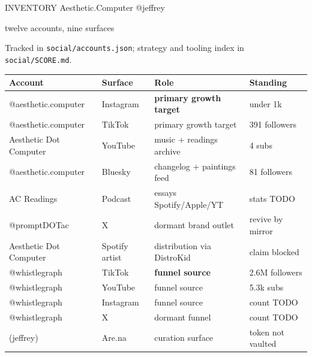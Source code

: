 \documentclass[12pt]{article}
\makeatletter
\newcommand{\ac}{Aesthetic\textcolor{acpink}{.}Computer}
\newenvironment{slide}[2]{%
  \clearpage
  {\footnotesize\color{acgray}\MakeUppercase{#1}\hfill}%
  {\footnotesize\color{acgray}\ac{} \textperiodcentered{} @jeffrey}\par
  \vspace{0.1em}
  {\acbold\fontsize{31pt}{35pt}\selectfont\color{acdark}#2\par}
  \vspace{0.9em}
  \large
}{%
  \vfill
  {\hfill\footnotesize\color{acgray}\thepage}%
}
\makeatother
\begin{document}
\begin{slide}{inventory}{twelve accounts, nine surfaces}
Tracked in \texttt{social/accounts.json}; strategy and tooling index in \texttt{social/SCORE.md}.

\vspace{0.8em}
\begin{center}
\normalsize
\begin{tabular}{@{}llll@{}}
\toprule
\textbf{Account} & \textbf{Surface} & \textbf{Role} & \textbf{Standing} \\
\midrule
@aesthetic.computer & Instagram & \textbf{primary growth target} & under 1k \\
@aesthetic.computer & TikTok & primary growth target & 391 followers \\
Aesthetic Dot Computer & YouTube & music + readings archive & 4 subs \\
@aesthetic.computer & Bluesky & changelog + paintings feed & 81 followers \\
AC Readings & Podcast & essays \textrightarrow{} Spotify/Apple/YT & stats TODO \\
@promptDOTac & X & dormant brand outlet & revive by mirror \\
Aesthetic Dot Computer & Spotify artist & distribution via DistroKid & claim blocked \\
@whistlegraph & TikTok & \textbf{funnel source} & 2.6M followers \\
@whistlegraph & YouTube & funnel source & 5.3k subs \\
@whistlegraph & Instagram & funnel source & count TODO \\
@whistlegraph & X & dormant funnel & count TODO \\
(jeffrey) & Are.na & curation surface & token not vaulted \\
\bottomrule
\end{tabular}
\end{center}
\end{slide}
\end{document}
